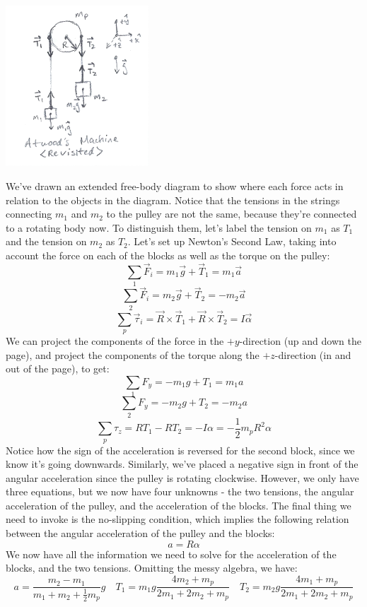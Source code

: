 \begin{center}
	\includegraphics[width=0.4\textwidth]{images/mechintro/atwood-revisited.png}\\
\end{center}
We've drawn an extended free-body diagram to show where each force acts in relation to the objects in the diagram. Notice that the tensions in the strings connecting $m_1$ and $m_2$ to the pulley are not the same, because they're connected to a rotating body now. To distinguish them, let's label the tension on $m_1$ as $T_1$ and the tension on $m_2$ as $T_2$. Let's set up Newton's Second Law, taking into account the force on each of the blocks as well as the torque on the pulley:
\[
	\sum_1 \vec F_i = m_1 \vec g + \vec T_1 = m_1 \vec a
\]
\[
	\sum_2 \vec F_i = m_2 \vec g + \vec T_2 = -m_2 \vec a
\]
\[
	\sum_p \vec \tau_i = \vec R \times \vec T_1 + \vec R \times \vec T_2 = I \vec \alpha
\]
We can project the components of the force in the $+y$-direction (up and down the page), and project the components of the torque along the $+z$-direction (in and out of the page), to get:
\[
	\sum_1 F_y = -m_1g + T_1 = m_1a 
\]
\[
	\sum_2 F_y = -m_2g + T_2 = -m_2a
\]
\[
	\sum_p \tau_z = RT_1 - RT_2 = -I\alpha = -\frac{1}{2}m_pR^2 \alpha
\]
Notice how the sign of the acceleration is reversed for the second block, since we know it's going downwards. Similarly, we've placed a negative sign in front of the angular acceleration since the pulley is rotating clockwise. However, we only have three equations, but we now have four unknowns - the two tensions, the angular acceleration of the pulley, and the acceleration of the blocks. The final thing we need to invoke is the no-slipping condition, which implies the following relation between the angular acceleration of the pulley and the blocks:
\[
	a = R \alpha
\]
We now have all the information we need to solve for the acceleration of the blocks, and the two tensions. Omitting the messy algebra, we have:
\[
	a = \frac{m_2-m_1}{m_1+m_2+\frac{1}{2}m_p}g \quad T_1 = m_1g\frac{4m_2+m_p}{2m_1+2m_2+m_p} \quad T_2 = m_2g\frac{4m_1+m_p}{2m_1+2m_2+m_p} 
\]

